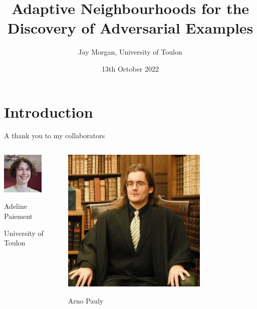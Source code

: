 \documentclass[smaller]{beamer}
\author{Jay Morgan, University of Toulon}
\date{13th October 2022}
\title{Adaptive Neighbourhoods for the Discovery of Adversarial Examples}
\begin{document}
\maketitle

\section{Introduction}
\label{sec:orgbc2fc33}

\begin{frame}[label={sec:org50a9592}]{A thank you to my collaborators}
\begin{columns}
\begin{column}{0.3\columnwidth}
\begin{center}
\includegraphics[width=0.7\textwidth]{images/Adeline-Paiement.jpg}
\end{center}
\begin{center}
Adeline Paiement

University of Toulon
\end{center}
\end{column}
\begin{column}{0.3\columnwidth}
\begin{center}
\includegraphics[width=0.7\textwidth]{images/Arno-Pauly.jpg}
\end{center}
\begin{center}
Arno Pauly


\end{center}
\end{column}
\end{columns}
\end{frame}
\end{document}
